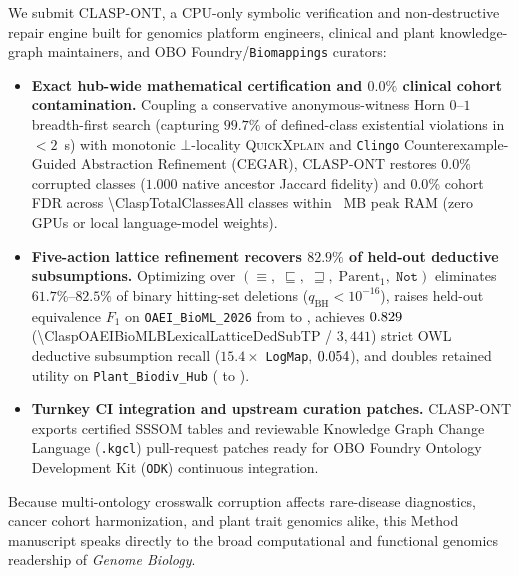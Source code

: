 \documentclass[10pt]{article}
\begin{document}
We submit \textsc{CLASP-ONT}, a CPU-only symbolic verification and non-destructive repair engine built for genomics platform engineers, clinical and plant knowledge-graph maintainers, and OBO Foundry/\texttt{Biomappings} curators:
\begin{itemize}[leftmargin=1.45em,label={\color{accent}\rule[0.35ex]{0.38em}{0.38em}},itemsep=4.5pt,topsep=2pt,parsep=0pt]
  \item \textbf{Exact hub-wide mathematical certification and $0.0\%$ clinical cohort contamination.} Coupling a conservative anonymous-witness Horn $0\text{--}1$ breadth-first search (capturing $99.7\%$ of defined-class existential violations in $<2$~s) with monotonic $\bot$-locality \textsc{QuickXplain} and \texttt{Clingo} Counterexample-Guided Abstraction Refinement (CEGAR), \textsc{CLASP-ONT} restores $0.0\%$ corrupted classes ($1.000$ native ancestor Jaccard fidelity) and $0.0\%$ cohort FDR across \num{\ClaspTotalClassesAll} classes within \ClaspMaxPeakRssMBAll{}~MB peak RAM (zero GPUs or local language-model weights).
  \item \textbf{Five-action lattice refinement recovers $82.9\%$ of held-out deductive subsumptions.} Optimizing over $(\equiv,\; \sqsubseteq,\; \sqsupseteq,\; \mathrm{Parent}_1,\; \texttt{Not})$ eliminates $61.7\%\text{--}82.5\%$ of binary hitting-set deletions ($q_{\mathrm{BH}} < 10^{-16}$), raises held-out equivalence $F_1$ on \texttt{OAEI\_BioML\_2026} from \ClaspOAEIBioMLBASPBinaryDeleteEquivFone{} to \ClaspOAEIBioMLBLexicalLatticeEquivFone{}, achieves $0.829{}$ (\num{\ClaspOAEIBioMLBLexicalLatticeDedSubTP} / $3{,}441$) strict OWL deductive subsumption recall ($15.4\times$ \texttt{LogMap}, $0.054{}$), and doubles retained utility on \texttt{Plant\_Biodiv\_Hub} (\ClaspPlantBiodivHubBASPBinaryDeleteRetention{} to \ClaspPlantBiodivHubBLexicalLatticeRetention{}).
  \item \textbf{Turnkey CI integration and upstream curation patches.} \textsc{CLASP-ONT} exports certified SSSOM tables and reviewable Knowledge Graph Change Language (\texttt{.kgcl}) pull-request patches ready for OBO Foundry Ontology Development Kit (\texttt{ODK}) continuous integration.
\end{itemize}

Because multi-ontology crosswalk corruption affects rare-disease diagnostics, cancer cohort harmonization, and plant trait genomics alike, this Method manuscript speaks directly to the broad computational and functional genomics readership of \emph{Genome Biology}.
\end{document}
